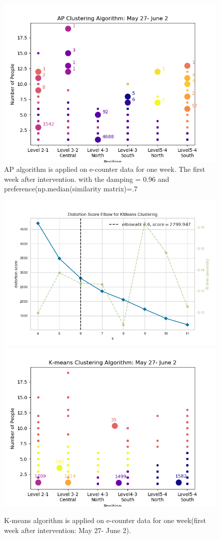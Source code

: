 \begin{figure}[!h]
    \centering
    \includegraphics[width = 11 cm]{image/Chapters/Chapter6/ApFirstWeekAfterInt.png}
    \caption{AP algorithm is applied on e-counter data for one week. The first week after intervention. with the damping = 0.96 and preference(np.median(similarity matrix)=.7  }
    \label{apaft}
\end{figure}




\begin{figure}[!h]
    \centering
    \includegraphics[width=.49\textwidth]{image/Chapters/Chapter6/elbowAfterInt.png}
    \includegraphics[width=.49\textwidth]{image/Chapters/Chapter6/kmeans1WeekAfter.png}
    \caption{K-means algorithm is applied on e-counter data for one week(first week after intervention: May 27- June 2).}
    \label{elbkmean}
\end{figure}   







